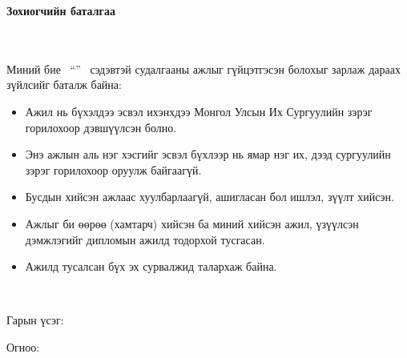 \makefrontpage
\maketitle

\doublespace

\begin{huge}
\textbf{Зохиогчийн баталгаа}
\end{huge} \\ \ \\ 
\doublespace
Миний бие \@author \ ``\@title'' \ сэдэвтэй судалгааны ажлыг гүйцэтгэсэн болохыг зарлаж дараах зүйлсийг баталж байна:
\begin{itemize}
\item Ажил нь бүхэлдээ эсвэл ихэнхдээ Монгол Улсын Их Сургуулийн зэрэг горилохоор дэвшүүлсэн болно.
\item Энэ ажлын аль нэг хэсгийг эсвэл бүхлээр нь ямар нэг их, дээд сургуулийн зэрэг горилохоор оруулж байгаагүй.
\item Бусдын хийсэн ажлаас хуулбарлаагүй, ашигласан бол ишлэл, зүүлт хийсэн.
\item Ажлыг би өөрөө (хамтарч) хийсэн ба миний хийсэн ажил, үзүүлсэн дэмжлэгийг дипломын ажилд тодорхой тусгасан. 
\item Ажилд тусалсан бүх эх сурвалжид талархаж байна. 
\end{itemize} 
\
 
Гарын үсэг: \underline{\hspace{5cm}}

Огноо:         \ \ \underline{\hspace{3cm}}

\setcounter{tocdepth}{1}
\tableofcontents

\listoffigures

\listoftables

\lstlistoflistings

\newpage
\newpage

\renewcommand{\cftlabel}{Зураг}


\doublespace
{}

